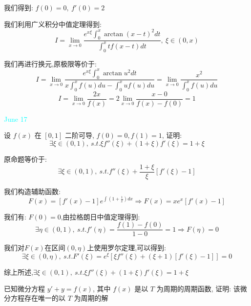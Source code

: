 \begin{solution}
	
	我们得到: $f(0)=0,\ f'(0)=2$
	
	我们利用广义积分中值定理得到: 
	$$I=\lim\limits_{x\to 0}\dfrac{e^{x\xi}\int_{0}^{x}\arctan(x-t)^2dt}{\int_{0}^{x}tf(x-t)dt},\ \xi\in(0,x)$$
	
	我们再进行换元,原极限等价于: 
	$$I=\lim\limits_{x\to 0}\dfrac{e^{x\xi}\int_{0}^{x}\arctan u^2dt}{x\int_{0}^{x}f(u)du-\int_{0}^{x}uf(u)du}=\lim\limits_{x\to 0}\dfrac{x^2}{\int_{0}^{x}f(u)du}$$
	$$I=\lim\limits_{x\to 0}\dfrac{2x}{f(x)}=2\lim\limits_{x\to 0}\dfrac{x-0}{f(x)-f(0)}=1$$
\end{solution}


\textcolor{cyan}{June 17}

\begin{example}[][Exam: 32.3.5]
	设 $f(x)$ 在 $[0,1]$ 二阶可导, $f(0)=0,f(1)=1$, 证明: $$\exists \xi\in(0,1),\ s.t. \xi f''(\xi)+(1+\xi)f'(\xi)=1+\xi$$
\end{example}

\begin{solution}
	
	原命题等价于: 
	$$\exists \xi\in(0,1),\ s.t. f''(\xi)+\dfrac{1+\xi}{\xi}[f'(\xi)-1]$$
	
	我们构造辅助函数: 
	$$F(x)=[f'(x)-1]e^{\int(1+\frac{1}{x})dx}\Rightarrow F(x)=xe^x[f'(x)-1]$$
	
	我们有: $F(0)=0$,由拉格朗日中值定理得到: 
	$$\exists \eta\in(0,1),\ s.t. f'(\eta)=\dfrac{f(1)-f(0)}{1-0}=1\Rightarrow F(\eta)=0$$
	
	我们对$F(x)$在区间$(0,\eta)$上使用罗尔定理,可以得到: 
	$$\exists \xi\in(0,\eta),\ s.t. F'(\xi)=e^{\xi}[\xi f''(\xi)+(\xi+1)[f'(\xi)-1]]=0$$
	
	综上所述,$\exists \xi\in(0,1),\ s.t. \xi f''(\xi)+(1+\xi)f'(\xi)=1+\xi$
\end{solution}

\begin{example}[][Exam: 32.3.6]
	已知微分方程 $y'+y=f(x)$, 其中 $f(x)$ 是以 $T$ 为周期的周期函数, 证明: 该微分方程存在唯一的以 $T$ 为周期的解
\end{example}

